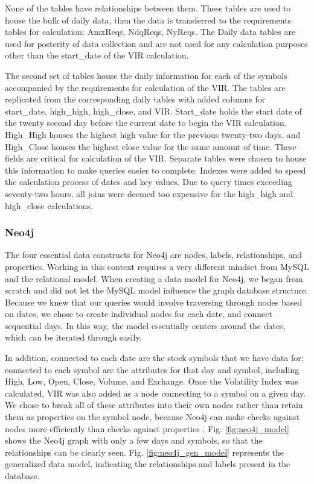 \documentclass{IEEEtran}
\begin{document}
None of the tables have relationships between them. These tables are used to house the bulk of daily data, then the data is transferred to the requirements tables for calculation: AmxReqs, NdqReqs, NyReqs. The Daily data tables are used for posterity of data collection and are not used for any calculation purposes other than the start\_date of the VIR calculation. 

The second set of tables house the daily information for each of the symbols accompanied by the requirements for calculation of the VIR. The tables are replicated from the corresponding daily tables with added columns for start\_date, high\_high, high\_close, and VIR. Start\_date holds the start date of the twenty second day before the current date to begin the VIR calculation. High\_High houses the highest high value for the previous twenty-two days, and High\_Close houses the highest close value for the same amount of time. These fields are critical for calculation of the VIR. Separate tables were chosen to house this information to make queries easier to complete. Indexes were added to speed the calculation process of dates and key values. Due to query times exceeding seventy-two hours, all joins were deemed too expensive for the high\_high and high\_close calculations. 

\subsubsection{Neo4j}

The four essential data constructs for Neo4j are nodes, labels, relationships, and properties. Working in this context requires a very different mindset from MySQL and the relational model. When creating a data model for Neo4j, we began from scratch and did not let the MySQL model influence the graph database structure. Because we knew that our queries would involve traversing through nodes based on dates, we chose to create individual nodes for each date, and connect sequential days. In this way, the model essentially centers around the dates, which can be iterated through easily.  

In addition, connected to each date are the stock symbols that we have data for; connected to each symbol are the attributes for that day and symbol, including High, Low, Open, Close, Volume, and Exchange. Once the Volatility Index was calculated, VIR was also added as a node connecting to a symbol on a given day. We chose to break all of these attributes into their own nodes rather than retain them as properties on the symbol node, because Neo4j can make checks against nodes more efficiently than checks against properties \cite{neo4j-book}. Fig. \ref{fig:neo4j_model} shows the Neo4j graph with only a few days and symbols, so that the relationships can be clearly seen. Fig. \ref{fig:neo4j_gen_model} represents the generalized data model, indicating the relationships and labels present in the database. 
\end{document}
